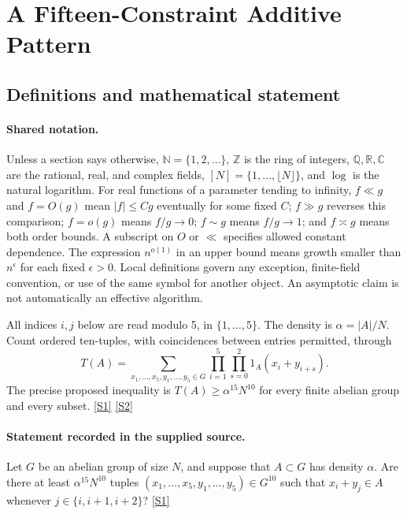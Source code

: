 \documentclass[11pt,a4paper]{article}
\newcommand{\N}{\mathbb{N}}
\newcommand{\Z}{\mathbb{Z}}
\newcommand{\Q}{\mathbb{Q}}
\newcommand{\R}{\mathbb{R}}
\newcommand{\C}{\mathbb{C}}
\newcommand{\sref}[2]{\hyperlink{source:#1:#2}{[S#2]}}
\begin{document}
\section{A Fifteen-Constraint Additive Pattern}\label{statement}


\subsection{Definitions and mathematical statement}

\paragraph{Shared notation.}Unless a section says otherwise, $\N=\{1,2,\ldots\}$,
$\Z$ is the ring of integers, $\Q,\R,\C$ are the rational, real, and complex
fields, $[N]=\{1,\ldots,\lfloor N\rfloor\}$, and $\log$ is the natural
logarithm. For real functions of a parameter tending to infinity,
$f\ll g$ and $f=O(g)$ mean $|f|\leq Cg$ eventually for some fixed $C$;
$f\gg g$ reverses this comparison; $f=o(g)$ means $f/g\to0$;
$f\sim g$ means $f/g\to1$; and $f\asymp g$ means both order bounds.
A subscript on $O$ or $\ll$ specifies allowed constant dependence.
The expression $n^{o(1)}$ in an upper bound means growth smaller than
$n^\epsilon$ for each fixed $\epsilon>0$. Local definitions govern any
exception, finite-field convention, or use of the same symbol for another
object. An asymptotic claim is not automatically an effective algorithm.



All indices $i,j$ below are read modulo 5, in $\{1,\ldots,5\}$. The density is $\alpha=|A|/N$. Count ordered ten-tuples, with coincidences between entries permitted, through
\[T(A)=\sum_{x_1,\ldots,x_5,y_1,\ldots,y_5\in G}\prod_{i=1}^5\prod_{s=0}^2 1_A(x_i+y_{i+s}).\]
The precise proposed inequality is $T(A)\geq\alpha^{15}N^{10}$ for every finite abelian group and every subset. \sref{statement}{1} \sref{statement}{2}

\paragraph{Statement recorded in the supplied source.}
Let $G$ be an abelian group of size $N$, and suppose that $A \subset G$ has density $\alpha$. Are there at least $\alpha^{15}N^{10}$ tuples $(x_1, \ldots, x_5, y_1, \ldots, y_5) \in G^{10}$ such that $x_i + y_j \in A$ whenever $j \in \{i, i+1, i+2\}$? \sref{statement}{1}
\end{document}
